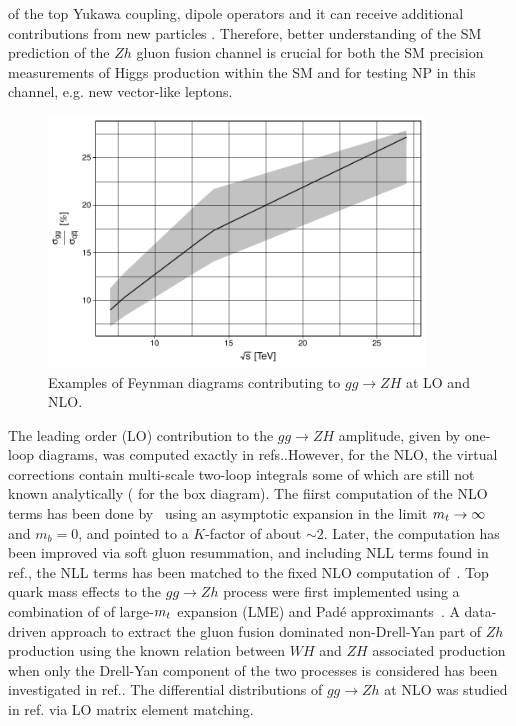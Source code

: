 of the top Yukawa coupling,  dipole operators \cite{Englert:2016hvy}
and it can receive additional contributions from new particles \cite{Harlander:2013mla}. Therefore, better understanding of the SM prediction of the $Zh$ gluon fusion channel is crucial for both the SM precision measurements of Higgs production within the SM and for testing NP in this channel, e.g. new vector-like leptons.  
\begin{figure}
	\begin{center}
		\includegraphics[width=10cm]{./figures/hz_ratio}
		\caption{Examples of Feynman diagrams contributing to $gg \to ZH$ at  LO and
			NLO.}
		\label{fig:hzratio}
	\end{center}
\end{figure}
\par  The leading order (LO) contribution to the $g g \rightarrow Z H$ amplitude, given by one-loop diagrams, was computed exactly in refs.\cite{Kniehl:1990iva, Dicus:1988yh}.However, for the NLO, the virtual corrections contain multi-scale two-loop integrals some of which are still not known analytically ( for the box diagram).  The fiirst computation of the NLO terms has been done by~\cite{Altenkamp:2012sx} using an asymptotic expansion in the limit
$m_t \rightarrow \infty$ and $m_b = 0$, and pointed to a $K$-factor of about $\sim2$.  Later, the computation has been improved via soft gluon resummation, and including NLL terms found in ref.\cite{Harlander:2014wda}, the NLL terms has been matched to the fixed NLO computation of~\cite{Altenkamp:2012sx}.  Top quark mass effects to the  $g g \rightarrow Zh$ process were first implemented using a combination of of large-$m_t$ expansion (LME) and Pad\'e approximants~\cite{Hasselhuhn:2016rqt}. A data-driven approach to extract the gluon fusion dominated non-Drell-Yan part of $Zh$ production using the known relation between  $W H$
and $ Z H$ associated production when only the Drell-Yan component of the two processes is considered has been investigated in ref.\cite{Harlander:2018yns}. The differential distributions of $g g \rightarrow Zh$  at NLO was studied in ref.\cite{Hespel:2015zea} via LO matrix element matching. 
